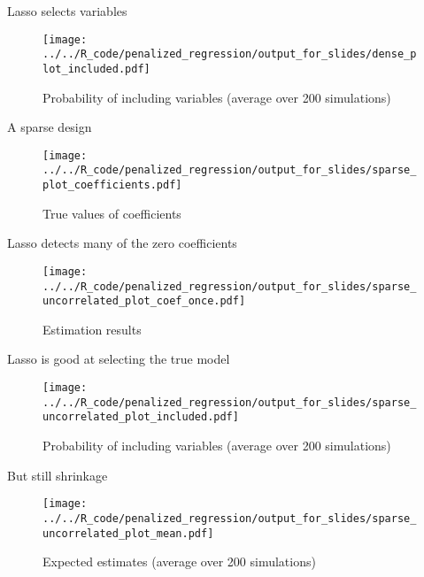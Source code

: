 \documentclass[xcolor=dvipsnames]{beamer}
\begin{document}
\begin{frame}{Lasso selects variables}
\begin{figure}
  \texttt{[image: ../../R\_code/penalized\_regression/output\_for\_slides/dense\_plot\_included.pdf]}
   \caption{Probability of including variables (average over 200 simulations)}
\end{figure}
\end{frame}

\begin{frame}{A sparse design}
\begin{figure}
  \texttt{[image: ../../R\_code/penalized\_regression/output\_for\_slides/sparse\_plot\_coefficients.pdf]}
   \caption{True values of coefficients}
\end{figure}
\end{frame}

\begin{frame}{Lasso detects many of the zero coefficients}
\begin{figure}
  \texttt{[image: ../../R\_code/penalized\_regression/output\_for\_slides/sparse\_uncorrelated\_plot\_coef\_once.pdf]}
   \caption{Estimation results}
\end{figure}
\end{frame}

\begin{frame}{Lasso is good at selecting the true model}
\begin{figure}
  \texttt{[image: ../../R\_code/penalized\_regression/output\_for\_slides/sparse\_uncorrelated\_plot\_included.pdf]}
   \caption{Probability of including variables (average over 200 simulations)}
\end{figure}
\end{frame}

\begin{frame}{But still shrinkage}
\begin{figure}
  \texttt{[image: ../../R\_code/penalized\_regression/output\_for\_slides/sparse\_uncorrelated\_plot\_mean.pdf]}
   \caption{Expected estimates (average over 200 simulations)}
\end{figure}
\end{frame}



\appendix
\end{document}
